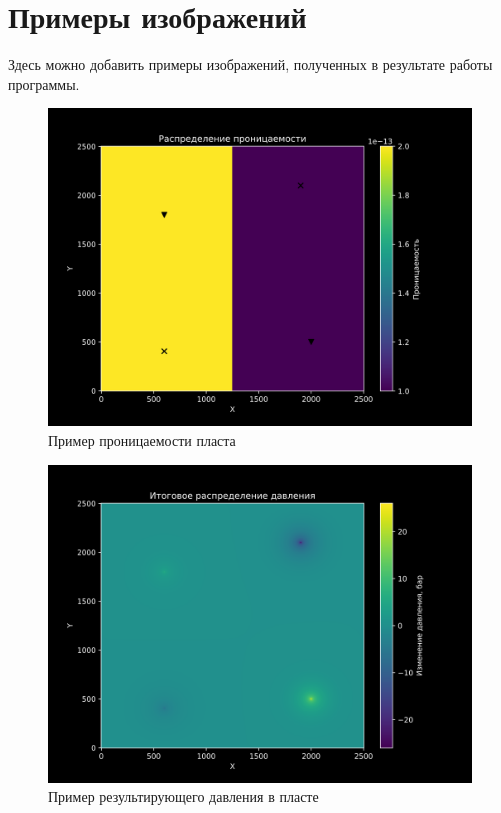 \documentclass{article}
\begin{document}
\section{Примеры изображений}

Здесь можно добавить примеры изображений, полученных в результате работы программы.

\begin{figure}[h]
    \centering
    \includegraphics[width=1.0\textwidth]{проницаемость.png}
    \caption{Пример проницаемости пласта}
\end{figure}

\begin{figure}[h]
    \centering
    \includegraphics[width=1.0\textwidth]{результат_давление.png}
    \caption{Пример результирующего давления в пласте}
\end{figure}
\end{document}
